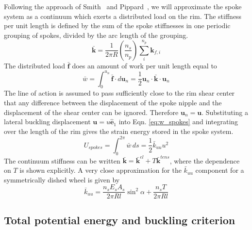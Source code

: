 \documentclass{bmd2016p}
\begin{document}
Following the approach of Smith~\cite{Smith1901a} and Pippard~\cite{Pippard1932d}, we will approximate the spoke system as a continuum which exerts a distributed load on the rim. The stiffness per unit length is defined by the sum of the spoke stiffnesses in one periodic grouping of spokes, divided by the arc length of the grouping.
	\begin{equation}\label{eq:kbar}
	\bar{\bm{k}} = \frac{1}{2\pi R}\left(\frac{n_s}{n_p}\right) \sum_i^{n_p} \bm{k}_{f, i}
	\end{equation}
	The distributed load $\bar{\bm{f}}$ does an amount of work per unit length equal to
	\begin{equation}\label{eq:w_spokes}
	\bar{w} = \int_0^{u_n} \bar{\bm{f}} \cdot d\bm{u}_n = \frac{1}{2} \bm{u}_n \cdot \bar{\bm{k}} \cdot \bm{u}_n
	\end{equation}
The line of action is assumed to pass sufficiently close to the rim shear center that any difference between the displacement of the spoke nipple and the displacement of the shear center can be ignored. Therefore $\bm{u}_n = \bm{u}$. Substituting a lateral buckling displacement $\bm{u}=u\hat{\bm{e}}_1$ into Eqn. \ref{eq:w_spokes} and integrating over the length of the rim gives the strain energy stored in the spoke system.
	\begin{equation}\label{eq:Us}
	U_{spokes} = \int_0^{2\pi} \bar{w} \, ds = \frac{1}{2} \bar{k}_{uu}u^2
	\end{equation}
The continuum stiffness can be written $\bar{\bm{k}} = \bar{\bm{k}}^{el} + T\bar{\bm{k}}^{tens}$, where the dependence on $T$ is shown explicitly. A very close approximation for the $\bar{k}_{uu}$ component for a symmetrically dished wheel is given by
	\begin{equation}\label{eq:kuu}
	\bar{k}_{uu} = \frac{n_sE_sA_s}{2\pi Rl}\sin^2{\alpha} + \frac{n_s T}{2\pi Rl}
	\end{equation}


\subsection{Total potential energy and buckling criterion}
\end{document}
